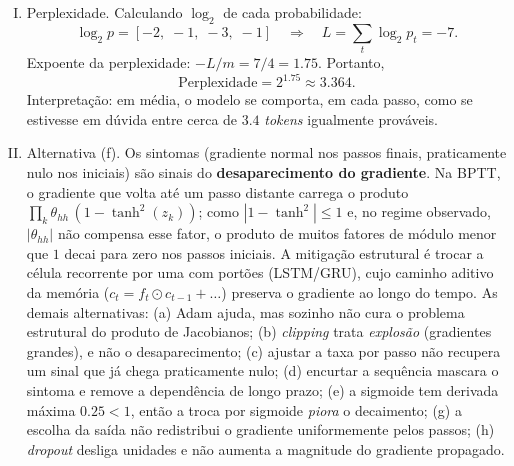 \documentclass{dlproblemset}
\begin{document}
\begin{enumerate}[I)]
\begin{enumerate}[a)]
        \item BPTT para $\theta_{hh}$. Gradientes intermediários:
        \begin{align*}
            \frac{\partial J}{\partial h_2} &= (\hat{y}_2 - y)\,\theta_{ho} \approx -1.1981 \\
            \frac{\partial J}{\partial z_2} &= \frac{\partial J}{\partial h_2}\,(1 - h_2^2) \approx -1.1981 \cdot (1 - 0.0393) \approx -1.1511 \\
            \frac{\partial J}{\partial h_1} &= \frac{\partial J}{\partial z_2}\,\theta_{hh} \approx -1.1511 \cdot 0.3 \approx -0.3453 \\
            \frac{\partial J}{\partial z_1} &= \frac{\partial J}{\partial h_1}\,(1 - h_1^2) \approx -0.3453 \cdot (1 - 0.4410) \approx -0.1931
        \end{align*}
        A contribuição direta de $\theta_{hh}$ em $t=2$ tem fator $h_1$; em $t=1$ tem fator $h_0 = 0$, anulando o termo. Logo,
        \[
            \frac{\partial J}{\partial \theta_{hh}} = \frac{\partial J}{\partial z_2}\,h_1 + \frac{\partial J}{\partial z_1}\,h_0 \approx -1.1511 \cdot 0.6640 + 0 \approx -0.7644.
        \]
    \end{enumerate}

    \item Perplexidade. Calculando $\log_2$ de cada probabilidade:
    \[
        \log_2 p = [-2,\; -1,\; -3,\; -1] \quad\Rightarrow\quad L = \sum_t \log_2 p_t = -7.
    \]
    Expoente da perplexidade: $-L/m = 7/4 = 1.75$. Portanto,
    \[
        \text{Perplexidade} = 2^{1.75} \approx 3.364.
    \]
    Interpretação: em média, o modelo se comporta, em cada passo, como se estivesse em dúvida entre cerca de $3.4$ \textit{tokens} igualmente prováveis.

    \item Alternativa (f). Os sintomas (gradiente normal nos passos finais, praticamente nulo nos iniciais) são sinais do \textbf{desaparecimento do gradiente}. Na BPTT, o gradiente que volta até um passo distante carrega o produto $\prod_k \theta_{hh}\,(1 - \tanh^2(z_k))$; como $|1 - \tanh^2| \le 1$ e, no regime observado, $|\theta_{hh}|$ não compensa esse fator, o produto de muitos fatores de módulo menor que $1$ decai para zero nos passos iniciais. A mitigação estrutural é trocar a célula recorrente por uma com portões (LSTM/GRU), cujo caminho aditivo da memória ($c_t = f_t\odot c_{t-1} + \dots$) preserva o gradiente ao longo do tempo. As demais alternativas: (a) Adam ajuda, mas sozinho não cura o problema estrutural do produto de Jacobianos; (b) \textit{clipping} trata \emph{explosão} (gradientes grandes), e não o desaparecimento; (c) ajustar a taxa por passo não recupera um sinal que já chega praticamente nulo; (d) encurtar a sequência mascara o sintoma e remove a dependência de longo prazo; (e) a sigmoide tem derivada máxima $0.25 < 1$, então a troca por sigmoide \emph{piora} o decaimento; (g) a escolha da saída não redistribui o gradiente uniformemente pelos passos; (h) \textit{dropout} desliga unidades e não aumenta a magnitude do gradiente propagado.


\end{enumerate}
\end{document}
